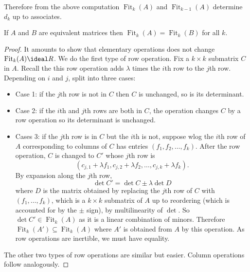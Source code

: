 \documentclass[a4paper]{article}
\theoremstyle{definition}
\DeclareMathOperator{\fit}{Fit}
\begin{document}
Therefore from the above computation \(\fit_k(A)\) and \(\fit_{k - 1}(A)\) determine \(d_k\) up to associates.

\begin{lemma}
  If \(A\) and \(B\) are equivalent matrices then \(\fit_k(A) = \fit_k(B)\) for all \(k\).
\end{lemma}

\begin{proof}
  It amounts to show that elementary operations does not change \(\fit_k(A) \ideal R\). We do the first type of row operation. Fix a \(k \times k\) submatrix \(C\) in \(A\). Recall the this row operation adds \(\lambda\) times the \(i\)th row to the \(j\)th row. Depending on \(i\) and \(j\), split into three cases:
  \begin{itemize}
  \item Case 1: if the \(j\)th row is not in \(C\) then \(C\) is unchanged, so is its determinant.
  \item Case 2: if the \(i\)th and \(j\)th rows are both in \(C\), the operation changes \(C\) by a row operation so its determinant is unchanged.
  \item Cases 3: if the \(j\)th row is in \(C\) but the \(i\)th is not, suppose wlog the \(i\)th row of \(A\) corresponding to columns of \(C\) has entries \((f_1, f_2, \dots, f_k)\). After the row operation, \(C\) is changed to \(C'\) whose \(j\)th row is
    \[
      (c_{j, 1} + \lambda f_1, c_{j, 2} + \lambda f_2, \dots, c_{j, k} + \lambda f_k).
    \]
    By expansion along the \(j\)th row,
    \[
      \det C' = \det C \pm \lambda \det D
    \]
    where \(D\) is the matrix obtained by replacing the \(j\)th row of \(C\) with \((f_1, \dots, f_k)\), which is a \(k \times k\) submatrix of \(A\) up to reordering (which is accounted for by the \(\pm\) sign), by multilinearity of \(\det\). So \(\det C' \in \fit_k(A)\) as it is a linear combination of minors. Therefore \(\fit_k(A') \subseteq \fit_k(A)\) where \(A'\) is obtained from \(A\) by this operation. As row operations are inertible, we must have equality.
  \end{itemize}

  The other two types of row operations are similar but easier. Column operations follow analogously.
\end{proof}
\end{document}
